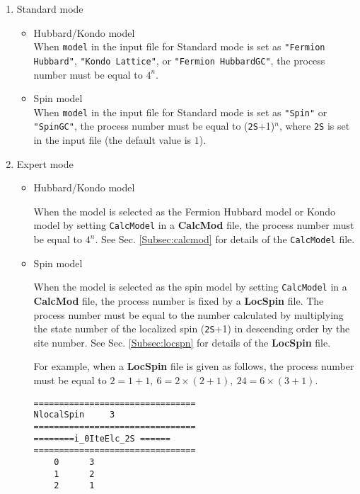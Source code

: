 \begin{enumerate}
\item{Standard mode}

\begin{itemize}
\item{Hubbard/Kondo model}\\
  When \verb|model| in the input file for Standard mode is set as
  \verb|"Fermion Hubbard"|, \verb|"Kondo Lattice"|, or \verb|"Fermion HubbardGC"|,
  the process number must be equal to $4^n$.

\item{Spin model}\\
  When \verb|model| in the input file for Standard mode is set as
  \verb|"Spin"| or \verb|"SpinGC"|, the process number must be equal to
  (\verb|2S|+1)${}^n$, where \verb|2S| is set in the input file
  (the default value is $1$).

\end{itemize}
\item{Expert mode}

\begin{itemize}
\item{Hubbard/Kondo model}

  When the model is selected as the Fermion Hubbard model or Kondo model
  by setting \verb|CalcModel| in a {\bf CalcMod} file,
  the process number must be equal to $4^n$.
  See Sec. \ref{Subsec:calcmod} for details of the \verb|CalcModel| file.

\item{Spin model}

  When the model is selected as the spin model by setting \verb|CalcModel|
  in a {\bf CalcMod} file, the process number is fixed by a {\bf LocSpin} file.
  The process number must be equal to the number calculated by
  multiplying the state number of the localized spin (\verb|2S|+1)
  in descending order by the site number.
  See Sec. \ref{Subsec:locspn} for details of the {\bf LocSpin} file.

  For example, when a {\bf LocSpin} file is given as follows,
  the process number must be equal to $2=1+1,~6=2\times(2+1),~24=6\times(3+1)$.
\begin{minipage}{10cm}
\begin{screen}
\begin{verbatim}
================================ 
NlocalSpin     3
================================ 
========i_0IteElc_2S ====== 
================================ 
    0      3
    1      2
    2      1
\end{verbatim}
\end{screen}
\end{minipage}


\end{itemize}
\end{enumerate}
